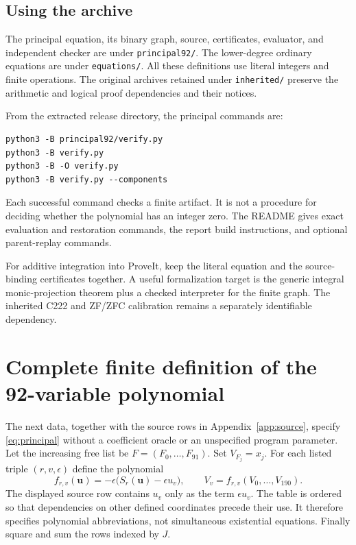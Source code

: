 \documentclass[11pt]{article}
\begin{document}
\subsection{Using the archive}

The principal equation, its binary graph, source, certificates,
evaluator, and independent checker are under \texttt{principal92/}.
The lower-degree ordinary equations are under \texttt{equations/}.
All these definitions use literal integers and finite operations.
The original archives retained under \texttt{inherited/} preserve
the arithmetic and logical proof dependencies and their notices.

From the extracted release directory, the principal commands are:
\begin{verbatim}
python3 -B principal92/verify.py
python3 -B verify.py
python3 -B -O verify.py
python3 -B verify.py --components
\end{verbatim}
Each successful command checks a finite artifact. It is not a procedure
for deciding whether the polynomial has an integer zero. The README
gives exact evaluation and restoration commands, the report build
instructions, and optional parent-replay commands.

For additive integration into ProveIt, keep the literal equation and
the source-binding certificates together. A useful formalization target
is the generic integral monic-projection theorem plus a checked
interpreter for the finite graph. The inherited C222 and ZF/ZFC
calibration remains a separately identifiable dependency.

\appendix
\section{Complete finite definition of the 92-variable polynomial}
\label{app:definition}

The next data, together with the source rows in Appendix~\ref{app:source},
specify \eqref{eq:principal} without a coefficient oracle or an
unspecified program parameter. Let the increasing free list be
$F=(F_0,\ldots,F_{91})$. Set $V_{F_j}=x_j$. For each listed triple
$(r,v,\epsilon)$ define the polynomial
\[
 f_{r,v}(\boldsymbol u)=-\epsilon
       \bigl(S_r(\boldsymbol u)-\epsilon u_v\bigr),\qquad
 V_v=f_{r,v}(V_0,\ldots,V_{190}).
\]
The displayed source row contains $u_v$ only as the term
$\epsilon u_v$. The table is ordered so that dependencies on other
defined coordinates precede their use. It therefore specifies
polynomial abbreviations, not simultaneous existential equations.
Finally square and sum the rows indexed by $J$.

\end{document}
